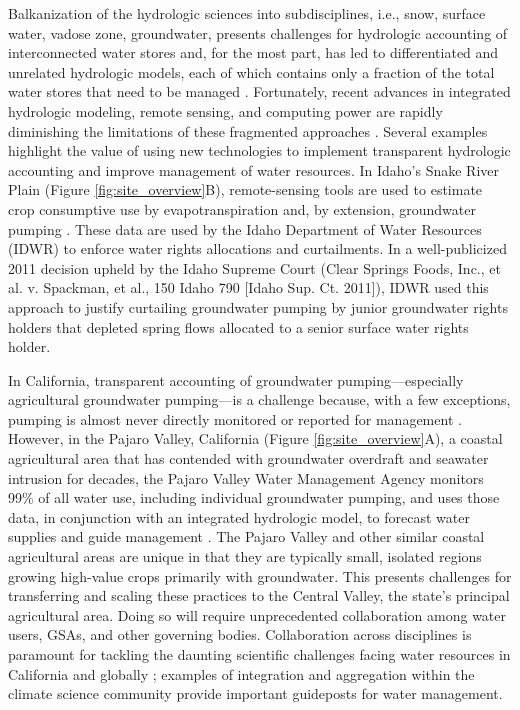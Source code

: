 Balkanization of the hydrologic sciences into subdisciplines, i.e., snow, surface water, vadose zone, groundwater, presents challenges for hydrologic accounting of interconnected water stores and, for the most part, has led to differentiated and unrelated hydrologic models, each of which contains only a fraction of the total water stores that need to be managed \citep{freeze_blueprint_1969,gutowski_challenges_2012}. Fortunately, recent advances in integrated hydrologic modeling, remote sensing, and computing power are rapidly diminishing the limitations of these fragmented approaches \citep{wood_hyperresolution_2011}. Several examples highlight the value of using new technologies to implement transparent hydrologic accounting and improve management of water resources. In Idaho’s Snake River Plain (Figure \ref{fig:site_overview}B), remote-sensing tools are used to estimate crop consumptive use by evapotranspiration and, by extension, groundwater pumping \citep{allen_landsat-based_2005}. These data are used by the Idaho Department of Water Resources (IDWR) to enforce water rights allocations and curtailments. In a well-publicized 2011 decision upheld by the Idaho Supreme Court (Clear Springs Foods, Inc., et al. v. Spackman, et al., 150 Idaho 790 [Idaho Sup. Ct. 2011]), IDWR used this approach to justify curtailing groundwater pumping by junior groundwater rights holders that depleted spring flows allocated to a senior surface water rights holder. 

In California, transparent accounting of groundwater pumping—especially agricultural groundwater pumping—is a challenge because, with a few exceptions, pumping is almost never directly monitored or reported for management \citep{faunt_groundwater_2009}. However, in the Pajaro Valley, California (Figure \ref{fig:site_overview}A), a coastal agricultural area that has contended with groundwater overdraft and seawater intrusion for decades, the Pajaro Valley Water Management Agency monitors 99\% of all water use, including individual groundwater pumping, and uses those data, in conjunction with an integrated hydrologic model, to forecast water supplies and guide management \citep{levy_groundwater_2011,hanson_integrated_2014}. The Pajaro Valley and other similar coastal agricultural areas are unique in that they are typically small, isolated regions growing high-value crops primarily with groundwater. This presents challenges for transferring and scaling these practices to the Central Valley, the state’s principal agricultural area. Doing so will require unprecedented collaboration among water users, GSAs, and other governing bodies. Collaboration across disciplines is paramount for tackling the daunting scientific challenges facing water resources in California and globally \citep{ruhi_tracking_2018}; examples of integration and aggregation within the climate science community \citep{bonan_forests_2008} provide important guideposts for water management.

